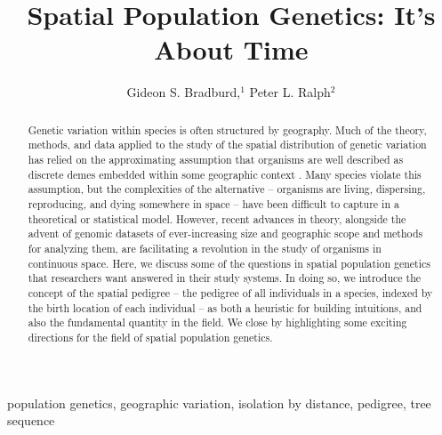 \documentclass{ar-1col}
\newcommand{\g}[1]{{\color{blue}{#1}}}
\newcommand{\todo}[1]{{\textbf{\color{red}{#1}}}}
\begin{document}

\title{Spatial Population Genetics: It's About Time}


\author{Gideon S. Bradburd,$^1$ Peter L. Ralph$^2$
}

\begin{abstract}
\todo{read through and edit}

Genetic variation within species is often structured by geography.
Much of the theory, methods, and data applied to the study 
of the spatial distribution of genetic variation 
has relied on the approximating assumption that 
organisms are well described as discrete demes  
embedded within some geographic context
\g{, like blueberries in a blueberry muffin}.
Many species violate this assumption, 
but the complexities of the alternative -- 
organisms are living, dispersing, reproducing, and dying 
somewhere in space -- 
have been difficult to capture in a theoretical or statistical model.
However, recent advances in theory, 
alongside the advent of genomic datasets 
of ever-increasing size and geographic scope 
and methods for analyzing them,
are facilitating a revolution in the study of organisms in continuous space.
Here, we discuss some of the questions in spatial population genetics 
that researchers want answered in their study systems.
In doing so, we introduce the concept of the spatial pedigree -- 
the pedigree of all individuals in a species, 
indexed by the birth location of each individual
--
as both a heuristic for building intuitions, 
and also the fundamental quantity in the field.
We close by highlighting some exciting directions 
for the field of spatial population genetics.
\end{abstract}

\begin{keywords}
population genetics, geographic variation, isolation by distance, pedigree, tree sequence
\end{keywords}
\maketitle
\end{document}
